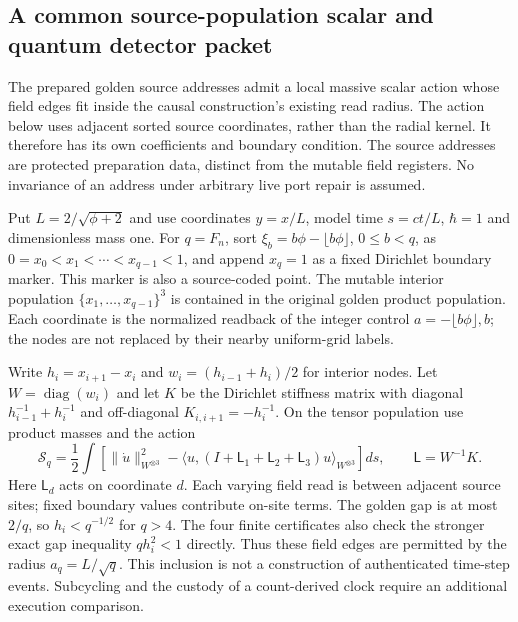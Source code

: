\subsection{A common source-population scalar and quantum detector packet}
\label{sec:source-common-scalar-packet}

The prepared golden source addresses admit a local massive scalar action
whose field edges fit inside the causal construction's existing read radius.
The action below uses adjacent sorted source coordinates, rather than the
radial kernel. It therefore has its own coefficients and boundary condition.
The source addresses are protected preparation data, distinct from the
mutable field registers. No invariance of an address under arbitrary live
port repair is assumed.

Put $L=2/\sqrt{\phi+2}$ and use coordinates $y=x/L$, model time
$s=ct/L$, $\hbar=1$ and dimensionless mass one. For $q=F_n$, sort
$\xi_b=b\phi-\lfloor b\phi\rfloor$, $0\le b<q$, as
$0=x_0<x_1<\cdots<x_{q-1}<1$, and append $x_q=1$ as a fixed Dirichlet
boundary marker. This marker is also a source-coded point. The mutable
interior population $\{x_1,\ldots,x_{q-1}\}^3$ is contained in the original
golden product population. Each coordinate is the normalized readback of the
integer control $a=-\lfloor b\phi\rfloor,b$; the nodes are not replaced by
their nearby uniform-grid labels.

Write $h_i=x_{i+1}-x_i$ and $w_i=(h_{i-1}+h_i)/2$ for interior nodes.
Let $W=\operatorname{diag}(w_i)$ and let $K$ be the Dirichlet stiffness
matrix with diagonal $h_{i-1}^{-1}+h_i^{-1}$ and off-diagonal
$K_{i,i+1}=-h_i^{-1}$. On the tensor population use product masses and
the action
\begin{equation}
 \mathcal S_q=\frac12\int\left[
 \|\dot u\|_{W^{\otimes3}}^2-
 \langle u,(I+\mathsf L_1+\mathsf L_2+\mathsf L_3)u\rangle_{W^{\otimes3}}
 \right]ds,\qquad \mathsf L=W^{-1}K.
 \label{eq:common-scalar-action}
\end{equation}
Here $\mathsf L_d$ acts on coordinate $d$. Each varying field read is between
adjacent source sites; fixed boundary values contribute on-site terms.
The golden gap is at most $2/q$, so $h_i<q^{-1/2}$ for $q>4$.
The four finite certificates also check the stronger exact gap inequality
$qh_i^2<1$ directly. Thus these field edges are permitted by the radius
$a_q=L/\sqrt q$. This inclusion is not a construction of authenticated
time-step events. Subcycling and the custody of a count-derived clock
require an additional execution comparison.


